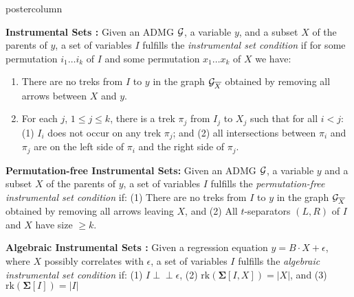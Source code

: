 \documentclass{beamer}
\def\ci{\perp\!\!\!\!\!\perp}
\begin{document}
\begin{frame}
\begin{columns}
\begin{column}{0.33\textwidth}
\begin{beamercolorbox}[center]{postercolumn}
\begin{minipage}{.98\textwidth}
{\begin{myblock}{}
\begin{figure}
					\end{figure}
				\end{myblock}
	\begin{myblock}{}
		\textbf{Instrumental Sets \citep{BritoP02}:}
		Given an ADMG $\cal
			G$, a variable $y$, and a subset $X$ of the parents of $y$, 
			a set of variables
			$I$ fulfills the 
			\emph{instrumental set condition}
			if for {some} permutation $ i_1 \ldots i_k $ of
			$ I $ and {some} permutation
			$ x_1 \ldots x_k $ of $ X $ we have: 
			\begin{enumerate}
				\item There are no treks from $I$ to $y$ in the graph ${\cal
					G}_{\overline{X}}$ obtained by removing all arrows 
					between $X$ and $y$. 
				\item For each $j$, $1 \leq j \leq k$, there is a trek $\pi_j$ from
					$I_j$ to $X_j$ such that for all $i < j$: (1) $I_i$ does not
					occur on any trek $\pi_j$; and (2) all intersections between
					$\pi_i$ and $\pi_j$ are on the left side of $\pi_i$ and the
					right side of $\pi_j$.
			\end{enumerate}
		\vspace{1em}

		\textbf{Permutation-free Instrumental Sets:}
			Given an ADMG $\cal G$, a variable $y$ and a subset $X$ of the parents
			of $y$, a set of variables $I$ fulfills the \emph{permutation-free
			instrumental set condition} if: (1) There are no treks from $I$ to $y$
			in the graph ${\cal G}_{\overline{X}}$ obtained by removing all arrows
			leaving $X$, and (2) All $t$-separators $(L,R)$ of $I$ and $X$ have
			size $\geq k$.
		\vspace{1em}

		\textbf{Algebraic Instrumental Sets \citep{bollen2012instrumental}:}
			Given a regression equation $y = B \cdot X + \epsilon$, where $X$ possibly
			correlates with $\epsilon$, a set of variables
			$I$ fulfills the \emph{algebraic instrumental set condition} if: (1) $I \ci \epsilon$,
			(2) $\textrm{rk}(\bm{\Sigma}[I,X]) = |X|$, and (3) $\textrm{rk}(\bm{\Sigma}[I]) = |I|$
		

\end{myblock}}
\end{minipage}
\end{beamercolorbox}
\end{column}
\end{columns}
\end{frame}
\end{document}
